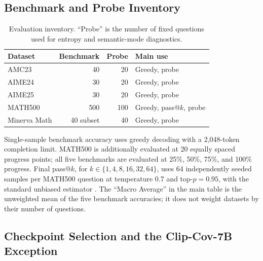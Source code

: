 \documentclass[letterpaper]{article}
\begin{document}
\subsection{Benchmark and Probe Inventory}

\begin{table}[t]
\centering
\small
\setlength{\tabcolsep}{3.1pt}
\begin{tabular*}{\columnwidth}{@{\extracolsep{\fill}}lrrl@{}}
\toprule
Dataset & Benchmark & Probe & Main use\\
\midrule
AMC23 & 40 & 20 & Greedy, probe\\
AIME24 & 30 & 20 & Greedy, probe\\
AIME25 & 30 & 20 & Greedy, probe\\
MATH500 & 500 & 100 & Greedy, pass@\(k\), probe\\
Minerva Math & 40 subset & 40 & Greedy, probe\\
\bottomrule
\end{tabular*}
\caption{Evaluation inventory.  ``Probe'' is the number of fixed questions
used for entropy and semantic-mode diagnostics.}
\label{tab:sup-inventory}
\end{table}

Single-sample benchmark accuracy uses greedy decoding with a 2,048-token
completion limit.  MATH500 is additionally evaluated at 20 equally spaced
progress points; all five benchmarks are evaluated at 25\%, 50\%, 75\%, and
100\% progress.  Final pass@\(k\), for
\(k\in\{1,4,8,16,32,64\}\), uses 64 independently seeded samples per MATH500
question at temperature 0.7 and top-\(p=0.95\), with the standard unbiased
estimator \citep{chen2021codex}.  The ``Macro Average'' in the main table is
the unweighted mean of the five benchmark accuracies; it does not weight
datasets by their number of questions.

\subsection{Checkpoint Selection and the Clip-Cov-7B Exception}
\end{document}
